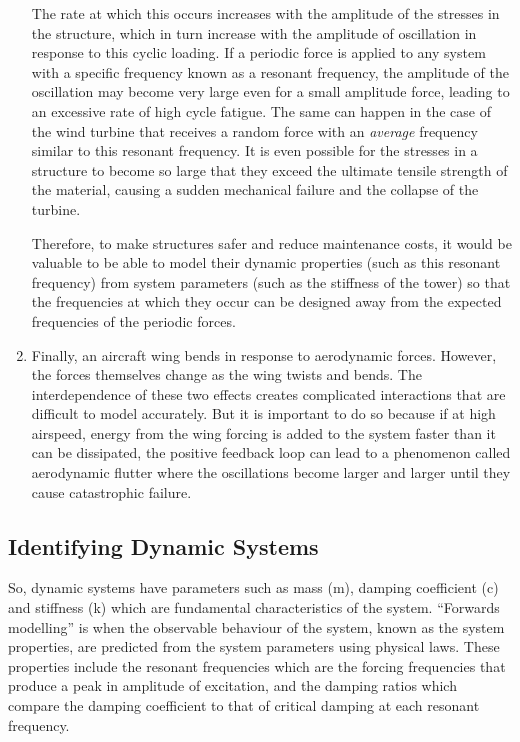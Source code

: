 \documentclass[12pt]{article}
\begin{document}
\begin{enumerate}[listparindent=\parindent]
        The rate at which this occurs increases with the amplitude of the stresses in the structure, which in turn increase with the amplitude of oscillation in response to this cyclic loading.
        If a periodic force is applied to any system with a specific frequency known as a resonant frequency, the amplitude of the oscillation may become very large even for a small amplitude force, leading to an excessive rate of high cycle fatigue.
        The same can happen in the case of the wind turbine that receives a random force with an \textit{average} frequency similar to this resonant frequency.
        It is even possible for the stresses in a structure to become so large that they exceed the ultimate tensile strength of the material, causing a sudden mechanical failure and the collapse of the turbine.

        Therefore, to make structures safer and reduce maintenance costs, it would be valuable to be able to model their dynamic properties (such as this resonant frequency) from system parameters (such as the stiffness of the tower) so that the frequencies at which they occur can be designed away from the expected frequencies of the periodic forces.

        \item Finally, an aircraft wing bends in response to aerodynamic forces.
        However, the forces themselves change as the wing twists and bends.
        The interdependence of these two effects creates complicated interactions that are difficult to model accurately.
        But it is important to do so because if at high airspeed, energy from the wing forcing is added to the system faster than it can be dissipated, the positive feedback loop can lead to a phenomenon called aerodynamic flutter where the oscillations become larger and larger until they cause catastrophic failure.
    \end{enumerate}

    \subsection{Identifying Dynamic Systems}

    So, dynamic systems have parameters such as mass (m), damping coefficient (c) and stiffness (k) which are fundamental characteristics of the system.
    ``Forwards modelling'' is when the observable behaviour of the system, known as the system properties, are predicted from the system parameters using physical laws.
    These properties include the resonant frequencies which are the forcing frequencies that produce a peak in amplitude of excitation, and the damping ratios which compare the damping coefficient to that of critical damping at each resonant frequency.
\end{document}
